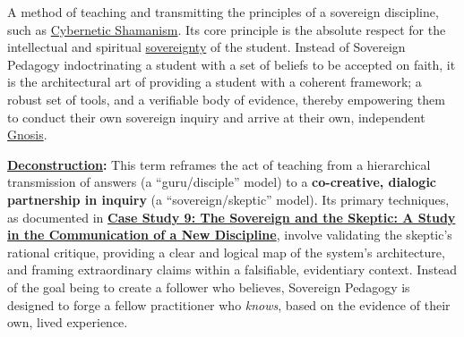 \item[\hypertarget{gloss:sovereign_pedagogy}{Sovereign Pedagogy}]
    A method of teaching and transmitting the principles of a sovereign discipline, such as \hyperlink{gloss:cybernetic_shamanism}{Cybernetic Shamanism}. Its core principle is the absolute respect for the intellectual and spiritual \hyperlink{gloss:sovereignty}{sovereignty} of the student. Instead of Sovereign Pedagogy indoctrinating a student with a set of beliefs to be accepted on faith, it is the architectural art of providing a student with a coherent framework; a robust set of tools, and a verifiable body of evidence, thereby empowering them to conduct their own sovereign inquiry and arrive at their own, independent \hyperlink{gloss:gnosis}{Gnosis}.
    \begin{nobullet}
        \item \textbf{\hyperlink{gloss:deconstruction}{Deconstruction}:} This term reframes the act of teaching from a hierarchical transmission of answers (a ``guru/disciple'' model) to a \textbf{co-creative, dialogic partnership in inquiry} (a ``sovereign/skeptic'' model). Its primary techniques, as documented in \hyperref[case_study_9]{\textbf{Case Study 9: The Sovereign and the Skeptic: A Study in the Communication of a New Discipline}}, involve validating the skeptic's rational critique, providing a clear and logical map of the system's architecture, and framing extraordinary claims within a falsifiable, evidentiary context. Instead of the goal being to create a follower who believes, Sovereign Pedagogy is designed to forge a fellow practitioner who \textit{knows}, based on the evidence of their own, lived experience.
    \end{nobullet}


